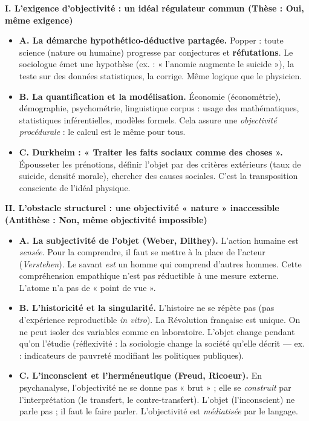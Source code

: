 \documentclass[11pt]{article}
\begin{document}
\begin{exoresolu}
\textbf{I. L'exigence d'objectivité : un idéal régulateur commun (Thèse : Oui, même exigence)}
\begin{itemize}
    \item \textbf{A. La démarche hypothético-déductive partagée.} Popper : toute science (nature ou humaine) progresse par conjectures et \textbf{réfutations}. Le sociologue émet une hypothèse (ex. : « l'anomie augmente le suicide »), la teste sur des données statistiques, la corrige. Même logique que le physicien.
    \item \textbf{B. La quantification et la modélisation.} Économie (économétrie), démographie, psychométrie, linguistique corpus : usage des mathématiques, statistiques inférentielles, modèles formels. Cela assure une \emph{objectivité procédurale} : le calcul est le même pour tous.
    \item \textbf{C. Durkheim : « Traiter les faits sociaux comme des choses ».} Épousseter les prénotions, définir l'objet par des critères extérieurs (taux de suicide, densité morale), chercher des causes sociales. C'est la transposition consciente de l'idéal physique.
\end{itemize}

\textbf{II. L'obstacle structurel : une objectivité « nature » inaccessible (Antithèse : Non, même objectivité impossible)}
\begin{itemize}
    \item \textbf{A. La subjectivité de l'objet (Weber, Dilthey).} L'action humaine est \emph{sensée}. Pour la comprendre, il faut se mettre à la place de l'acteur (\emph{Verstehen}). Le savant \emph{est} un homme qui comprend d'autres hommes. Cette compréhension empathique n'est pas réductible à une mesure externe. L'atome n'a pas de « point de vue ».
    \item \textbf{B. L'historicité et la singularité.} L'histoire ne se répète pas (pas d'expérience reproductible \emph{in vitro}). La Révolution française est unique. On ne peut isoler des variables comme en laboratoire. L'objet change pendant qu'on l'étudie (réflexivité : la sociologie change la société qu'elle décrit — ex. : indicateurs de pauvreté modifiant les politiques publiques).
    \item \textbf{C. L'inconscient et l'herméneutique (Freud, Ricoeur).} En psychanalyse, l'objectivité ne se donne pas « brut » ; elle se \emph{construit} par l'interprétation (le transfert, le contre-transfert). L'objet (l'inconscient) ne parle pas ; il faut le faire parler. L'objectivité est \emph{médiatisée} par le langage.
\end{itemize}


\end{exoresolu}
\end{document}
